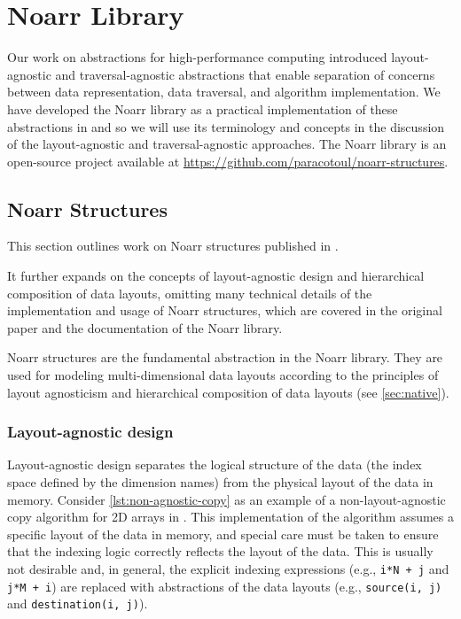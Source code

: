\chapter{Noarr Library}\label{chap:noarr}

Our work on abstractions for high-performance computing introduced layout-agnostic and traversal-agnostic abstractions that enable separation of concerns between data representation, data traversal, and algorithm implementation. We have developed the Noarr library as a practical implementation of these abstractions in \cpp and so we will use its terminology and concepts in the discussion of the layout-agnostic and traversal-agnostic approaches. The Noarr library is an open-source project available at \url{https://github.com/paracotoul/noarr-structures}.


\section{Noarr Structures}\label{sec:noarr-structures}

This section outlines work on Noarr structures published in .

It further expands on the concepts of layout-agnostic design and hierarchical composition of data layouts, omitting many technical details of the implementation and usage of Noarr structures, which are covered in the original paper and the documentation of the Noarr library.

Noarr structures are the fundamental abstraction in the Noarr library. They are used for modeling multi-dimensional data layouts according to the principles of layout agnosticism and hierarchical composition of data layouts (see \cref{sec:native}).

\subsection{Layout-agnostic design}\label{sec:layout-agnostic-design}

Layout-agnostic design separates the logical structure of the data (the index space defined by the dimension names) from the physical layout of the data in memory. Consider \cref{lst:non-agnostic-copy} as an example of a non-layout-agnostic copy algorithm for 2D arrays in \cpp. This implementation of the algorithm assumes a specific layout of the data in memory, and special care must be taken to ensure that the indexing logic correctly reflects the layout of the data. This is usually not desirable and, in general, the explicit indexing expressions (e.g., \texttt{i*N + j} and \texttt{j*M + i}) are replaced with abstractions of the data layouts (e.g., \lstinline{source(i, j)} and \lstinline{destination(i, j)}).

